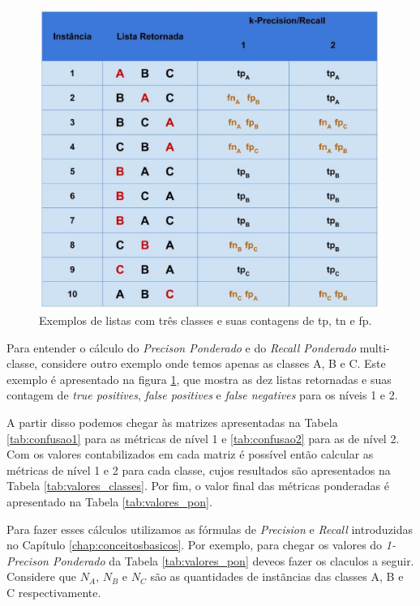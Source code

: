 \begin{figure}[h!]
  \centering
  \includegraphics[width=120mm,scale=0.9]{images/descricaodostestes03.eps}
  \caption{Exemplos de listas com três classes e suas contagens de tp, tn e fp.}
  \label{fig:descricaodostestes03}
\end{figure}

Para entender o cálculo do \textit{Precison Ponderado} e do \textit{Recall Ponderado} multi-classe, considere outro exemplo onde temos apenas as classes A, B e C.
Este exemplo é apresentado na figura \ref{fig:descricaodostestes03}, que mostra as dez listas retornadas e suas contagem de \textit{true positives}, \textit{false positives} e \textit{false negatives} para os níveis 1 e 2.

A partir disso podemos chegar às matrizes apresentadas na Tabela \ref{tab:confusao1} para as métricas de nível 1 e \ref{tab:confusao2} para as de nível 2.
Com os valores contabilizados em cada matriz é possível então calcular as métricas de nível 1 e 2 para cada classe, cujos resultados são apresentados na Tabela \ref{tab:valores_classes}.
Por fim, o valor final das métricas ponderadas é apresentado na Tabela \ref{tab:valores_pon}.

Para fazer esses cálculos utilizamos as fórmulas de \textit{Precision} e \textit{Recall} introduzidas no Capítulo \ref{chap:conceitosbasicos}.
Por exemplo, para chegar os valores do \textit{1-Precison Ponderado} da Tabela \ref{tab:valores_pon} deveos fazer os claculos a seguir.
Considere que $N_A$, $N_B$ e $N_C$ são as quantidades de instãncias das classes A, B e C respectivamente.

